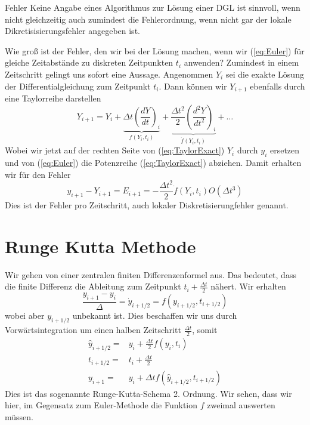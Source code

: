 \begin{note}{Fehler}
  Keine Angabe eines Algorithmus zur Lösung einer DGL ist sinnvoll, wenn nicht
  gleichzeitig auch zumindest die Fehlerordnung, wenn nicht gar der lokale
  Dikretisisierungsfehler angegeben ist.
\end{note}
Wie groß ist der Fehler, den wir bei der Lösung machen, wenn wir
(\ref{eq:Euler}) für gleiche Zeitabstände zu diskreten Zeitpunkten
$t_i$ anwenden? Zumindest in einem Zeitschritt gelingt uns sofort eine Aussage.
Angenommen $Y_i$ sei die exakte Lösung der Differentialgleichung zum Zeitpunkt
$t_i$. Dann können wir $Y_{i+1}$ ebenfalls durch eine Taylorreihe darstellen
\begin{equation}
  Y_{i+1}=Y_{i}
  +\underbrace{\Delta t \left(\frac{dY}{dt}\right)_i}_{f(Y_i,t_i)}
  +\underbrace{\frac{\Delta t^2}{2}\left(\frac{d^2Y}{dt^2}\right)_i}_{\dot{f}(Y_i,t_i)}+\dots
  \label{eq:TaylorExact}
\end{equation}
Wobei wir jetzt auf der rechten Seite von (\ref{eq:TaylorExact}) $Y_i$ durch
$y_i$ ersetzen und von (\ref{eq:Euler}) die Potenzreihe (\ref{eq:TaylorExact})
abziehen. Damit erhalten wir für den Fehler
\begin{equation}
  y_{i+1}-Y_{i+1}=E_{i+1}=-\frac{\Delta t^2}{2}\dot{f}(Y_i,t_i)O(\Delta t^3)
  \label{eq:LokalerFehler}
\end{equation}
Dies ist der Fehler pro Zeitschritt, auch lokaler Diskretisierungfehler genannt.
\section{Runge Kutta Methode}
Wir gehen von einer zentralen finiten Differenzenformel aus. Das bedeutet, dass
die finite Differenz die Ableitung zum Zeitpunkt $t_i+\frac{\Delta t}{2}$
nähert. Wir erhalten
\begin{equation}
  \frac{y_{i+1}- y_i}{\Delta}=\dot{y}_{i+1/2}= f(y_{i+1/2},t_{i+1/2})
  \label{eq:Midpoint}
\end{equation}
wobei aber $y_{i+1/2}$ unbekannt ist. Dies beschaffen wir uns durch
Vorwärtsintegration um einen halben Zeitschritt $\frac{\Delta t}{2}$, somit
\begin{align*}
  \hat{y}_{i+1/2}=&y_i+\frac{\Delta t}{2}f(y_{i},t_{i})\\
  t_{i+1/2} =& t_i+\frac{\Delta t}{2}\\
  y_{i+1} =& y_{i}+\Delta t f(\hat{y}_{i+1/2},t_{i+1/2})
\end{align*}
Dies ist das sogenannte Runge-Kutta-Schema 2. Ordnung. Wir sehen, dass wir
hier, im Gegensatz zum Euler-Methode die Funktion $f$ zweimal auswerten müssen.

